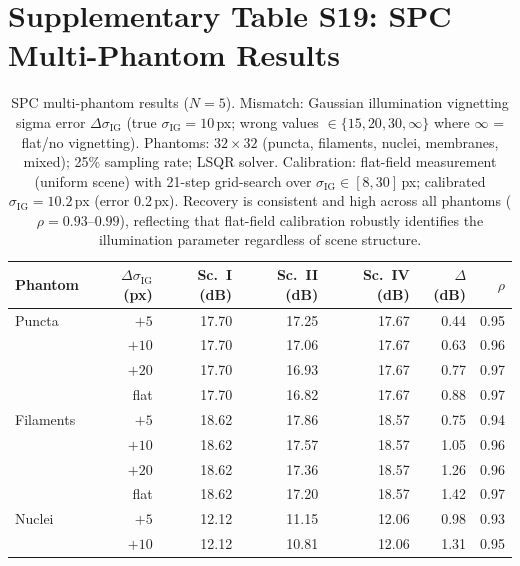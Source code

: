 \documentclass[11pt]{article}
\theoremstyle{definition}
\begin{document}

\section{Supplementary Table S19: SPC Multi-Phantom Results}
\label{sec:spc_scenes}

\begin{table}[htbp]
\centering
\caption{SPC multi-phantom results ($N{=}5$). Mismatch: Gaussian illumination vignetting sigma error $\Delta\sigma_\mathrm{IG}$
(true $\sigma_\mathrm{IG}{=}10$\,px; wrong values $\in \{15, 20, 30, \infty\}$ where $\infty$ = flat/no vignetting).
Phantoms: $32{\times}32$ (puncta, filaments, nuclei, membranes, mixed); 25\% sampling rate; LSQR solver.
Calibration: flat-field measurement (uniform scene) with 21-step grid-search over $\sigma_\mathrm{IG} \in [8, 30]$\,px;
calibrated $\sigma_\mathrm{IG}{=}10.2$\,px (error 0.2\,px).
Recovery is consistent and high across all phantoms ($\rho{=}0.93$--$0.99$), reflecting
that flat-field calibration robustly identifies the illumination parameter regardless of scene structure.}
\label{tab:spc_scenes}
\small
\begin{tabular}{l r r r r r r}
\toprule
Phantom & $\Delta\sigma_\mathrm{IG}$ (px) & Sc.~I (dB) & Sc.~II (dB) & Sc.~IV (dB) & $\Delta$(dB) & $\rho$ \\
\midrule
Puncta       & $+5$    & 17.70 & 17.25 & 17.67 & 0.44 & 0.95 \\
             & $+10$   & 17.70 & 17.06 & 17.67 & 0.63 & 0.96 \\
             & $+20$   & 17.70 & 16.93 & 17.67 & 0.77 & 0.97 \\
             & flat    & 17.70 & 16.82 & 17.67 & 0.88 & 0.97 \\
Filaments    & $+5$    & 18.62 & 17.86 & 18.57 & 0.75 & 0.94 \\
             & $+10$   & 18.62 & 17.57 & 18.57 & 1.05 & 0.96 \\
             & $+20$   & 18.62 & 17.36 & 18.57 & 1.26 & 0.96 \\
             & flat    & 18.62 & 17.20 & 18.57 & 1.42 & 0.97 \\
Nuclei       & $+5$    & 12.12 & 11.15 & 12.06 & 0.98 & 0.93 \\
             & $+10$   & 12.12 & 10.81 & 12.06 & 1.31 & 0.95 \\

\end{tabular}
\end{table}
\end{document}
